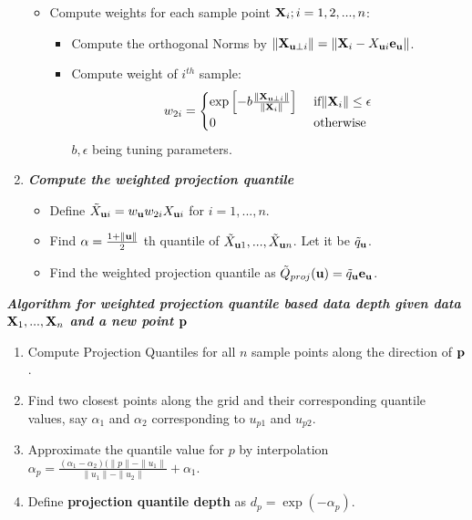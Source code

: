 \documentclass{article}
\begin{document}
\begin{enumerate}
\begin{itemize}
\item Compute weights for each sample point ${\mathbf{X}}_i; i=1,2,...,n$:

\begin{itemize}
\item Compute the orthogonal Norms by $\|{\mathbf{X}}_{{\bf{u}}\perp i}\|=\|{\mathbf{X}}_i-X_{{\bf{u}} i}{\bf{e}}_{\bf{u}}\|$.

\item Compute weight of $i^{th}$ sample:
$$w_{2i} = \begin{cases}
\exp\left[-b\frac{\|{\mathbf{X}}_{{\bf{u}}\perp i}\|}{\|{\mathbf{X}}_i\|}\right] & \mbox{ if}\|{\mathbf{X}}_i\|\leq\epsilon\\
0 & \mbox{ otherwise}
\end{cases} $$
$b,\epsilon$ being tuning parameters.
\end{itemize}
\end{itemize} 

\item \textit{\textbf{Compute the weighted projection quantile}}

\begin{itemize}

\item Define $\tilde X_{{\bf{u}} i} = w_{\bf{u}} w_{2i}X_{{\bf{u}} i}$ for $i=1,...,n$.

\item Find $\alpha=\frac{1+\|{\bf{u}}\|}{2}$ th quantile of $\tilde X_{{\bf{u}} 1},...,\tilde X_{{\bf{u}} n}$. Let it be $\tilde q_{\bf{u}}$.

\item Find the weighted projection quantile as $\tilde Q_{proj}({\bf{u}})=\tilde q_{\bf{u}}{\bf{e}}_{\bf{u}}$.

\end{itemize}

\end{enumerate}

\newpage

\textbf{\textit{Algorithm for weighted projection quantile based data depth given data ${\mathbf{X}}_1,...,{\mathbf{X}}_n$ and a new point ${\bf{p}}$}}

\begin{enumerate}


\item Compute Projection Quantiles for all $n$ sample points along the direction of ${\bf{p}}$.

\item Find two closest points along the grid and their corresponding quantile values, say $\alpha_1$ and $\alpha_2$ corresponding to $u_{p1}$ and $u_{p2}$.

\item Approximate the quantile value for $p$ by interpolation $\alpha_p=\frac{(\alpha_1-\alpha_2)(\|p\|-\|u_1\|}{\|u_1\|-\|u_2\|}+\alpha_1$.

\item Define \textbf{projection quantile depth} as $d_p=\exp(-\alpha_p)$.

\end{enumerate}
\end{document}

